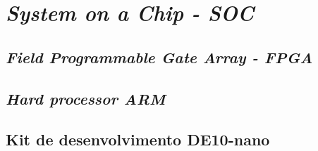 \chapter{\textit{System on a Chip - SOC}}


\section{\textit{Field Programmable Gate Array - FPGA}}

\section{\textit{Hard processor ARM}}

\section{Kit de desenvolvimento DE10-nano}